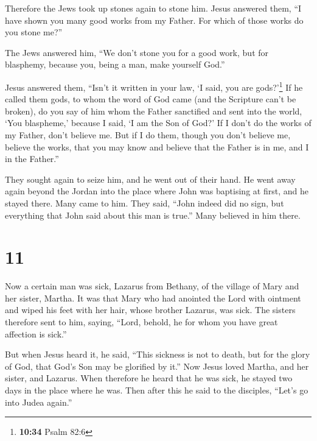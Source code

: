  Therefore the Jews took up stones again to stone him.
 Jesus answered them, ``I have shown you many good works
from my Father. For which of those works do you stone me?''

 The Jews answered him, ``We don't stone you for a good
work, but for blasphemy, because you, being a man, make yourself God.''

 Jesus answered them, ``Isn't it written in your law, `I
said, you are gods?'\footnote{\textbf{10:34} Psalm 82:6} 
If he called them gods, to whom the word of God came (and the Scripture
can't be broken),  do you say of him whom the Father
sanctified and sent into the world, `You blaspheme,' because I said, `I
am the Son of God?'  If I don't do the works of my
Father, don't believe me.  But if I do them, though you
don't believe me, believe the works, that you may know and believe that
the Father is in me, and I in the Father.''

 They sought again to seize him, and he went out of their
hand.  He went away again beyond the Jordan into the
place where John was baptising at first, and he stayed there.
 Many came to him. They said, ``John indeed did no sign,
but everything that John said about this man is true.'' 
Many believed in him there.

\hypertarget{section-10}{%
\section{11}\label{section-10}}

 Now a certain man was sick, Lazarus from Bethany, of the
village of Mary and her sister, Martha.  It was that Mary
who had anointed the Lord with ointment and wiped his feet with her
hair, whose brother Lazarus, was sick.  The sisters
therefore sent to him, saying, ``Lord, behold, he for whom you have
great affection is sick.''

 But when Jesus heard it, he said, ``This sickness is not
to death, but for the glory of God, that God's Son may be glorified by
it.''  Now Jesus loved Martha, and her sister, and
Lazarus.  When therefore he heard that he was sick, he
stayed two days in the place where he was.  Then after
this he said to the disciples, ``Let's go into Judea again.''

